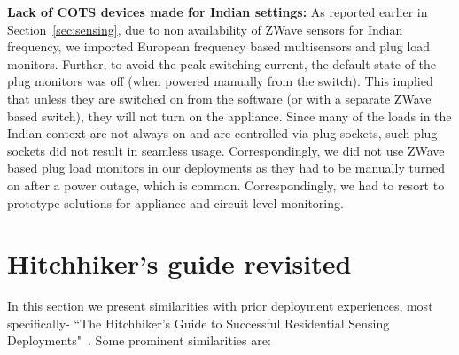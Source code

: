 \documentclass[10pt]{sensys-proc}
\newcommand{\secref}[1]{Section~\ref{#1}}
\begin{document}
\noindent \textbf{Lack of COTS devices made for Indian settings:} As reported earlier in \secref{sec:sensing}, due to non availability of ZWave sensors for Indian frequency, we imported European frequency based multisensors and plug load monitors. 
Further, to avoid the peak switching current, the default state of the plug monitors was off (when powered manually from the switch). This implied that unless they are switched on from the software (or with a separate ZWave based switch), they will not turn on the appliance. Since many of the loads in the Indian context are not always on and are controlled via plug sockets, such plug sockets did not result in seamless usage. Correspondingly, we did not use ZWave based plug load monitors in our deployments as they had to be manually turned on after a power outage, which is common. %
Correspondingly, we had to resort to prototype solutions for appliance and circuit level monitoring.
\vspace{-1mm}
\section{Hitchhiker's guide revisited}
\label{sec:common}
In this section we present similarities with prior deployment experiences, most specifically- ``The Hitchhiker's Guide to Successful Residential Sensing Deployments"~\cite{hitchhiker_residential}. Some prominent similarities are:
\end{document}
